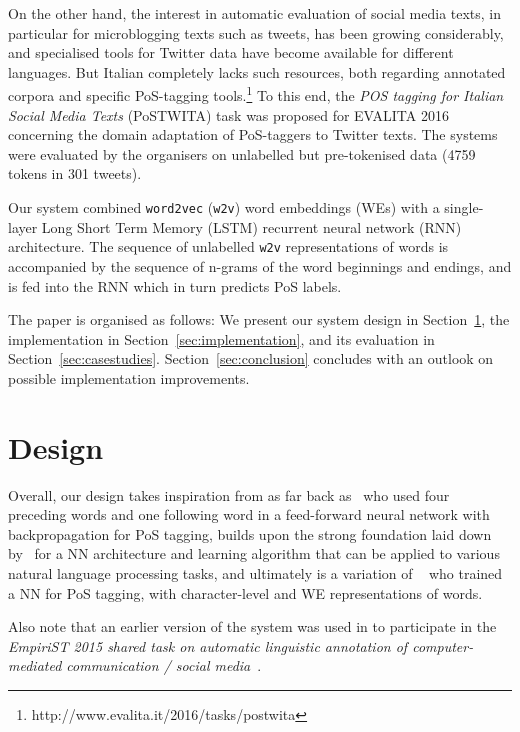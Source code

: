 \documentclass[11pt]{article}
\newcommand\wtv{\texttt{w2v}\xspace}
\begin{document}
On the other hand, the interest in automatic evaluation of social media texts,
in particular for microblogging texts such as tweets, has been growing
considerably, and specialised tools for Twitter data have become available for
different languages. 
But Italian completely lacks such resources, both regarding annotated corpora
and specific PoS-tagging tools.\footnote{http://www.evalita.it/2016/tasks/postwita}
To this end, the \emph{POS tagging for Italian Social Media Texts} (PoSTWITA)
task was proposed for EVALITA 2016 concerning the domain adaptation of
PoS-taggers to Twitter texts.
The systems were evaluated by the organisers on unlabelled but pre-tokenised
data (4759 tokens in 301 tweets).

Our system combined \texttt{word2vec} (\wtv) word embeddings (WEs) with a
single-layer Long Short Term Memory (LSTM) recurrent neural network (RNN)
architecture.
The sequence of unlabelled \wtv representations of words is accompanied by
the sequence of n-grams of the word beginnings and endings, and is fed into the
RNN which in turn predicts PoS labels.

The paper is organised as follows: We present our system design in
Section~\ref{sec:design}, the implementation in
Section~\ref{sec:implementation}, and its evaluation in
Section~\ref{sec:casestudies}. 
Section~\ref{sec:conclusion} concludes with an outlook on possible
implementation improvements.

\section{Design} %
\label{sec:design}

Overall, our design takes inspiration from as far back as~
who used four preceding words and one following word in a feed-forward neural
network with backpropagation for PoS tagging, builds upon the strong foundation
laid down by~ for a NN architecture and learning
algorithm that can be applied to various natural language processing tasks, and
ultimately is a variation of
~ who trained a NN for PoS tagging, with 
character-level and WE representations of words. 

Also note that an earlier version of the system was used in
 to participate in the \emph{EmpiriST 2015 shared
task on automatic linguistic annotation of computer-mediated communication /
social media}~\cite{empirist:2016:WAC-X}.
\end{document}
